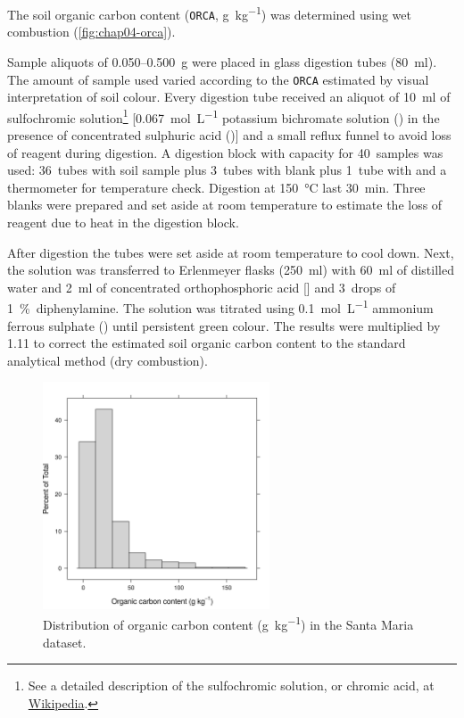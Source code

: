 The soil organic carbon content (\texttt{ORCA}, \si{\gram\per\kilo\gram}) was determined using wet combustion 
\cite{YeomansEtAl1988, Mebius1960, TedescoEtAl1995, ClaessenEtAl1997} (\autoref{fig:chap04-orca}).

\def\footsulfochromic{\footnote{See a detailed description of the sulfochromic solution, or chromic acid, at 
\href{http://en.wikipedia.org/wiki/Chromic_acid}{Wikipedia}.}}

Sample aliquots of \num{0.050}--\SI{0.500}{\g} were placed in glass digestion tubes (\SI{80}{\ml}). The 
amount of sample used varied according to the \texttt{ORCA} estimated by visual interpretation of soil colour. 
Every digestion tube received an aliquot of \SI{10}{\ml} of sulfochromic solution\footsulfochromic{} 
[\SI{0.067}{\mole\per\liter} potassium bichromate solution () in the presence of concentrated 
sulphuric acid ()] and a small reflux funnel to avoid loss of reagent during digestion. A digestion 
block with capacity for \num{40}~samples was used: \num{36}~tubes with soil sample plus \num{3}~tubes with 
blank plus \num{1}~tube with  and a thermometer for temperature check. Digestion at 
\SI{150}{\celsius} last \SI{30}{\minute}. Three blanks were prepared and set aside at room temperature to 
estimate the loss of reagent due to heat in the digestion block.

After digestion the tubes were set aside at room temperature to cool down. Next, the solution was transferred 
to Erlenmeyer flasks (\SI{250}{\ml}) with \SI{60}{\ml} of distilled water and \SI{2}{\ml} of concentrated 
orthophosphoric acid [] and \num{3}~drops of \SI{1}{\percent}~diphenylamine. The solution was 
titrated using \SI{0.1}{\mole\per\liter} ammonium ferrous sulphate () until persistent 
green colour. The results were multiplied by \num{1.11} to correct the estimated soil organic carbon content 
to the standard analytical method (dry combustion).

\begin{figure}[!ht]
\centering
\includegraphics[width=0.60\textwidth]{fig/chap04-orca}
\caption[Distribution of organic carbon content in the Santa Maria dataset.]{Distribution of organic carbon 
content (\si{\gram\per\kilo\gram}) in the Santa Maria dataset.}
\label{fig:chap04-orca}
\end{figure}

